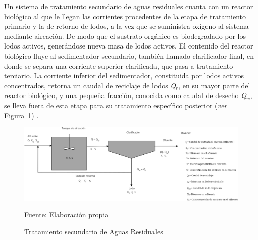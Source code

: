 Un sistema de tratamiento secundario de aguas residuales cuanta con un reactor biológico al que le llegan las corrientes procedentes de la etapa de tratamiento primario y la de retorno de lodos, a la vez que se suministra oxígeno al sistema mediante aireación. De modo que el sustrato orgánico es biodegradado por los lodos activos, generándose nueva masa de lodos activos. El contenido del reactor biológico fluye al sedimentador secundario, también llamado clarificador final, en donde se separa una corriente superior clarificada, que pasa a tratamiento terciario. La corriente inferior del sedimentador, constituida por lodos activos concentrados, retorna un caudal de reciclaje de lodos \emph{Q$_{r}$}, en su mayor parte del reactor biológico, y una pequeña fracción, conocida como caudal de desecho \emph{Q$_{w}$}, se lleva fuera de esta etapa para su tratamiento específico posterior (\emph{ver} Figura~\ref{fig:balance}) \emph{\citep{manuel13}}.
	\begin{figure}[!h]
		\centering
		\includegraphics[scale=0.52]{Diagrama_de_flujo.png}
		\caption{Tratamiento secundario de Aguas Residuales}
		\small{Fuente: Elaboración propia}
		\label{fig:balance}
	\end{figure}
